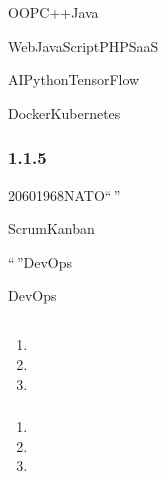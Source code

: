 
OOPC++Java

WebJavaScriptPHPSaaS


AIPythonTensorFlow

DockerKubernetes

\hypertarget{section-8}{%
\subsubsection{1.1.5}\label{section-8}}


20601968NATO``\,''




ScrumKanban

``\,''DevOps



\important{}

\important{}

\important{}

\important{}DevOps

\hypertarget{section-9}{%
\subsection{}\label{section-9}}

\hypertarget{section-10}{%
\subsubsection{}\label{section-10}}

\begin{enumerate}
\def\labelenumi{\arabic{enumi}.}
\tightlist
\item
\item
\item
\end{enumerate}

\hypertarget{section-11}{%
\subsubsection{}\label{section-11}}

\begin{enumerate}
\def\labelenumi{\arabic{enumi}.}
\tightlist
\item
\item
\item
\end{enumerate}

